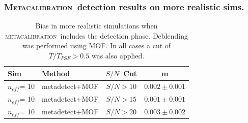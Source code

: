 \documentclass{beamer}
\newcommand{\mcal}{\textsc{metacalibration}}
\newcommand{\Mcal}{\textsc{Metacalibration}}
\newcommand{\snr}{$S/N$}
\newcommand{\neff}{$n_{eff}$}
\begin{document}
\begin{frame}
    \frametitle{\Mcal\ detection results on more realistic sims.}

 
    \begin{table}
        \centering
        \begin{tabular}{|l|l|c|c|}
            \hline
            Sim & Method         & \snr\ Cut & m             \\
            \hline

            \hline
            \neff={\color{green} 10} & metadetect+MOF    & \snr$ > 10$ & $0.002 \pm 0.001$  \\
            \neff={\color{green} 10} & metadetect+MOF    & \snr$ > 15$ & $0.001 \pm 0.001$  \\
            \neff={\color{green} 10} & metadetect+MOF    & \snr$ > 20$ & $0.003 \pm 0.002$  \\
            \hline

        \end{tabular}
        \caption{Bias in more realistic simulations when \mcal\ includes
            the detection phase.  Deblending was performed using MOF. 
            In all cases a cut of $T/T_{PSF} > 0.5$ was also applied.
        \label{tab:mcal:deblending}}
    \end{table}


\end{frame}
\end{document}
